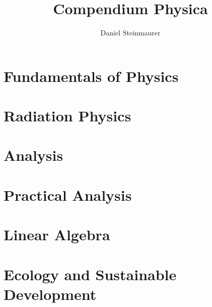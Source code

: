 \documentclass{report}
\title{Compendium Physica}
\author[1]{Daniel Steinmaurer}
\affil{Technische Physik, Technische Universität Wien}
\begin{document}

\maketitle

\newpage
\tableofcontents

\chapter{Fundamentals of Physics}







\chapter{Radiation Physics}



\chapter{Analysis}




\chapter{Practical Analysis}




\chapter{Linear Algebra}



\chapter{Ecology and Sustainable Development}


\listoffigures

\listoftables
\end{document}
